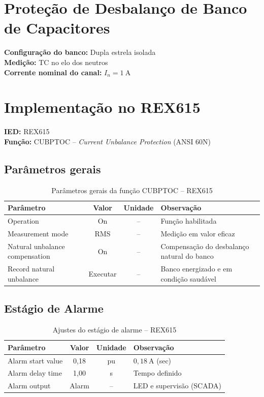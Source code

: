 \documentclass[12pt,a4paper]{article}
\begin{document}
	
	\section*{Proteção de Desbalanço de Banco de Capacitores}
	
	\textbf{Configuração do banco:} Dupla estrela isolada \\
	\textbf{Medição:} TC no elo dos neutros \\
	\textbf{Corrente nominal do canal:} $I_n = \SI{1}{\ampere}$
	
	\section{Implementação no REX615}
	
	\textbf{IED:} REX615 \\
	\textbf{Função:} CUBPTOC -- \textit{Current Unbalance Protection} (ANSI 60N)
	
	\subsection*{Parâmetros gerais}
	
	\begin{table}[H]
		\centering
		\caption{Parâmetros gerais da função CUBPTOC -- REX615}
		\begin{tabular}{>{\raggedright}p{5cm} c c p{5cm}}
			\toprule
			\textbf{Parâmetro} & \textbf{Valor} & \textbf{Unidade} & \textbf{Observação} \\
			\midrule
			Operation & On & -- & Função habilitada \\
			Measurement mode & RMS & -- & Medição em valor eficaz \\
			Natural unbalance compensation & On & -- & Compensação do desbalanço natural do banco \\
			Record natural unbalance & Executar & -- & Banco energizado e em condição saudável \\
			\bottomrule
		\end{tabular}
	\end{table}
	
	\subsection*{Estágio de Alarme}
	
	\begin{table}[H]
		\centering
		\caption{Ajustes do estágio de alarme -- REX615}
		\begin{tabular}{>{\raggedright}p{5cm} c c p{5cm}}
			\toprule
			\textbf{Parâmetro} & \textbf{Valor} & \textbf{Unidade} & \textbf{Observação} \\
			\midrule
			Alarm start value & 0{,}18 & pu & $0{,}18\ \si{\ampere}$ (sec) \\
			Alarm delay time & 1{,}00 & s & Tempo definido \\
			Alarm output & Alarm & -- & LED e supervisão (SCADA) \\
			\bottomrule
		\end{tabular}
	\end{table}
	
\end{document}
